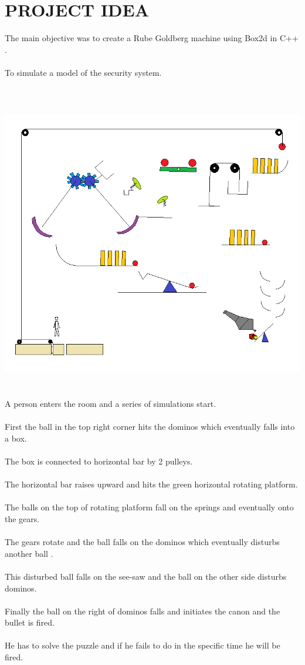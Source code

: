 \documentclass[a4paper, 11pt]{article}
\begin{document}
\section{\large{PROJECT IDEA}}
\large{
The main objective was to create a Rube Goldberg machine using Box2d in C++ .\\ \\
To simulate a model of the security system.\\ \\
\begin{center}
\includegraphics[height=13cm, scale=0.5]{img/Proposed.png} 
\end{center}
A person enters the room and a series of simulations start.\\ \\
First the ball in the top right corner hits the dominos which eventually falls into a box.\\ \\
The box is connected to horizontal bar by 2 pulleys.\\ \\
The horizontal bar raises upward and hits the green horizontal rotating platform.\\ \\
The balls on the top of rotating platform fall on the springs and eventually onto the gears.\\\\
The gears rotate and the ball falls on the dominos which eventually disturbs another ball .\\ \\
This disturbed ball falls on the see-saw and the ball on the other side disturbs dominos.\\ \\
Finally the ball on the right of dominos falls and initiates the canon and the bullet is fired.\\\\
He has to solve the puzzle and if he fails to do in the specific time he will be fired.\\ \\
}
\end{document}
